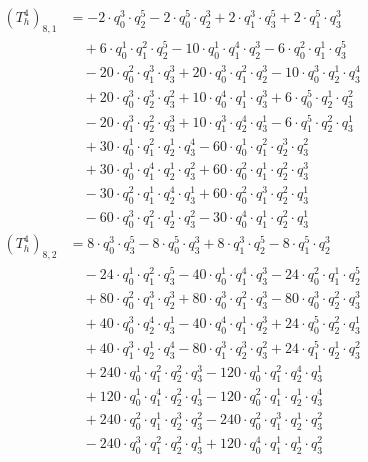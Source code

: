 \begin{align*}(T_{h}^4)_{8,1}&=-2\cdot q_0^{3}\cdot q_2^{5}-2\cdot q_0^{5}\cdot q_2^{3}+2\cdot q_1^{3}\cdot q_3^{5}+2\cdot q_1^{5}\cdot q_3^{3}\\
&\quad +6\cdot q_0^{1}\cdot q_1^{2}\cdot q_2^{5}-10\cdot q_0^{1}\cdot q_1^{4}\cdot q_2^{3}-6\cdot q_0^{2}\cdot q_1^{1}\cdot q_3^{5}\\
&\quad -20\cdot q_0^{2}\cdot q_1^{3}\cdot q_3^{3}+20\cdot q_0^{3}\cdot q_1^{2}\cdot q_2^{3}-10\cdot q_0^{3}\cdot q_2^{1}\cdot q_3^{4}\\
&\quad +20\cdot q_0^{3}\cdot q_2^{3}\cdot q_3^{2}+10\cdot q_0^{4}\cdot q_1^{1}\cdot q_3^{3}+6\cdot q_0^{5}\cdot q_2^{1}\cdot q_3^{2}\\
&\quad -20\cdot q_1^{3}\cdot q_2^{2}\cdot q_3^{3}+10\cdot q_1^{3}\cdot q_2^{4}\cdot q_3^{1}-6\cdot q_1^{5}\cdot q_2^{2}\cdot q_3^{1}\\
&\quad +30\cdot q_0^{1}\cdot q_1^{2}\cdot q_2^{1}\cdot q_3^{4}-60\cdot q_0^{1}\cdot q_1^{2}\cdot q_2^{3}\cdot q_3^{2}\\
&\quad +30\cdot q_0^{1}\cdot q_1^{4}\cdot q_2^{1}\cdot q_3^{2}+60\cdot q_0^{2}\cdot q_1^{1}\cdot q_2^{2}\cdot q_3^{3}\\
&\quad -30\cdot q_0^{2}\cdot q_1^{1}\cdot q_2^{4}\cdot q_3^{1}+60\cdot q_0^{2}\cdot q_1^{3}\cdot q_2^{2}\cdot q_3^{1}\\
&\quad -60\cdot q_0^{3}\cdot q_1^{2}\cdot q_2^{1}\cdot q_3^{2}-30\cdot q_0^{4}\cdot q_1^{1}\cdot q_2^{2}\cdot q_3^{1}\end{align*}
\begin{align*}(T_{h}^4)_{8,2}&=8\cdot q_0^{3}\cdot q_3^{5}-8\cdot q_0^{5}\cdot q_3^{3}+8\cdot q_1^{3}\cdot q_2^{5}-8\cdot q_1^{5}\cdot q_2^{3}\\
&\quad -24\cdot q_0^{1}\cdot q_1^{2}\cdot q_3^{5}-40\cdot q_0^{1}\cdot q_1^{4}\cdot q_3^{3}-24\cdot q_0^{2}\cdot q_1^{1}\cdot q_2^{5}\\
&\quad +80\cdot q_0^{2}\cdot q_1^{3}\cdot q_2^{3}+80\cdot q_0^{3}\cdot q_1^{2}\cdot q_3^{3}-80\cdot q_0^{3}\cdot q_2^{2}\cdot q_3^{3}\\
&\quad +40\cdot q_0^{3}\cdot q_2^{4}\cdot q_3^{1}-40\cdot q_0^{4}\cdot q_1^{1}\cdot q_2^{3}+24\cdot q_0^{5}\cdot q_2^{2}\cdot q_3^{1}\\
&\quad +40\cdot q_1^{3}\cdot q_2^{1}\cdot q_3^{4}-80\cdot q_1^{3}\cdot q_2^{3}\cdot q_3^{2}+24\cdot q_1^{5}\cdot q_2^{1}\cdot q_3^{2}\\
&\quad +240\cdot q_0^{1}\cdot q_1^{2}\cdot q_2^{2}\cdot q_3^{3}-120\cdot q_0^{1}\cdot q_1^{2}\cdot q_2^{4}\cdot q_3^{1}\\
&\quad +120\cdot q_0^{1}\cdot q_1^{4}\cdot q_2^{2}\cdot q_3^{1}-120\cdot q_0^{2}\cdot q_1^{1}\cdot q_2^{1}\cdot q_3^{4}\\
&\quad +240\cdot q_0^{2}\cdot q_1^{1}\cdot q_2^{3}\cdot q_3^{2}-240\cdot q_0^{2}\cdot q_1^{3}\cdot q_2^{1}\cdot q_3^{2}\\
&\quad -240\cdot q_0^{3}\cdot q_1^{2}\cdot q_2^{2}\cdot q_3^{1}+120\cdot q_0^{4}\cdot q_1^{1}\cdot q_2^{1}\cdot q_3^{2}\end{align*}

